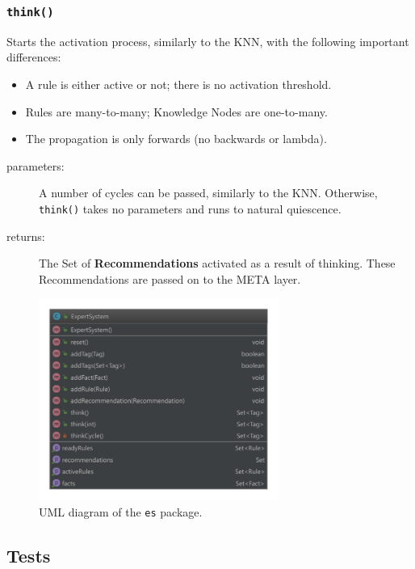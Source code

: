 \documentclass{beamer}
\newcommand{\code}[1]{\texttt{#1}}
\begin{document}
	\begin{frame}
		\frametitle{\code{think()}}
		Starts the activation process, similarly to the KNN, with the following important differences:
		\begin{itemize}
			\item A rule is either active or not; there is no activation threshold.
			\item Rules are many-to-many; Knowledge Nodes are one-to-many.
			\item The propagation is only forwards (no backwards or lambda).
		\end{itemize}
	
		\begin{description}
			\item[parameters:] A number of cycles can be passed, similarly to the KNN. Otherwise, \code{think()} takes no parameters and runs to natural quiescence.
			\item[returns:] The Set of \textbf{Recommendations} activated as a result of thinking. These Recommendations are passed on to the META layer.
		\end{description}
		
	\end{frame}

	\begin{frame}
		\begin{figure}
			\centering
			\includegraphics[width=0.7\textwidth]{figures/uml_es.pdf}
			\caption
			{UML diagram of the \code{es} package.}
			\label{fig:uml_es}
		\end{figure}
	\end{frame}

	\subsection{Tests}
	
\end{document}
